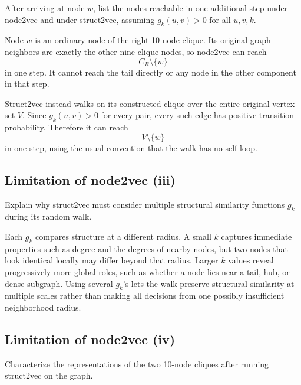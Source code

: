 After arriving at node $w$, list the nodes reachable in one additional step
under node2vec and under struct2vec, assuming $g_k(u,v)>0$ for all $u,v,k$.

\begin{solution}
Node \(w\) is an ordinary node of the right 10-node clique.  Its original-graph
neighbors are exactly the other nine clique nodes, so node2vec can reach
\[
  \boxed{C_R\setminus\{w\}}
\]
in one step.  It cannot reach the tail directly or any node in the other
component in that step.

Struct2vec instead walks on its constructed clique over the entire original
vertex set \(V\).  Since \(g_k(u,v)>0\) for every pair, every such edge has
positive transition probability.  Therefore it can reach
\[
  \boxed{V\setminus\{w\}}
\]
in one step, using the usual convention that the walk has no self-loop.
\end{solution}

\subsection{Limitation of node2vec (iii)}

Explain why struct2vec must consider multiple structural similarity functions
$g_k$ during its random walk.

\begin{solution}
Each \(g_k\) compares structure at a different radius.  A small \(k\) captures
immediate properties such as degree and the degrees of nearby nodes, but two
nodes that look identical locally may differ beyond that radius.  Larger
\(k\) values reveal progressively more global roles, such as whether a node
lies near a tail, hub, or dense subgraph.  Using several \(g_k\)'s lets the
walk preserve structural similarity at multiple scales rather than making
all decisions from one possibly insufficient neighborhood radius.
\end{solution}

\subsection{Limitation of node2vec (iv)}

Characterize the representations of the two 10-node cliques after running
struct2vec on the graph.

